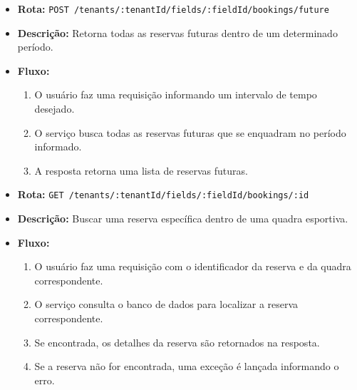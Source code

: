 \begin{itemize}
    \item \textbf{Rota:} \texttt{POST /tenants/:tenantId/fields/:fieldId/bookings/future}
    \item \textbf{Descrição:} Retorna todas as reservas futuras dentro de um determinado período.
    \item \textbf{Fluxo:}
    \begin{enumerate}
        \item O usuário faz uma requisição informando um intervalo de tempo desejado.
        \item O serviço busca todas as reservas futuras que se enquadram no período informado.
        \item A resposta retorna uma lista de reservas futuras.
    \end{enumerate}
\end{itemize}

\begin{itemize}
    \item \textbf{Rota:} \texttt{GET /tenants/:tenantId/fields/:fieldId/bookings/:id}
    \item \textbf{Descrição:} Buscar uma reserva específica dentro de uma quadra esportiva.
    \item \textbf{Fluxo:}
    \begin{enumerate}
        \item O usuário faz uma requisição com o identificador da reserva e da quadra correspondente.
        \item O serviço consulta o banco de dados para localizar a reserva correspondente.
        \item Se encontrada, os detalhes da reserva são retornados na resposta.
        \item Se a reserva não for encontrada, uma exceção é lançada informando o erro.
    \end{enumerate}
\end{itemize}

